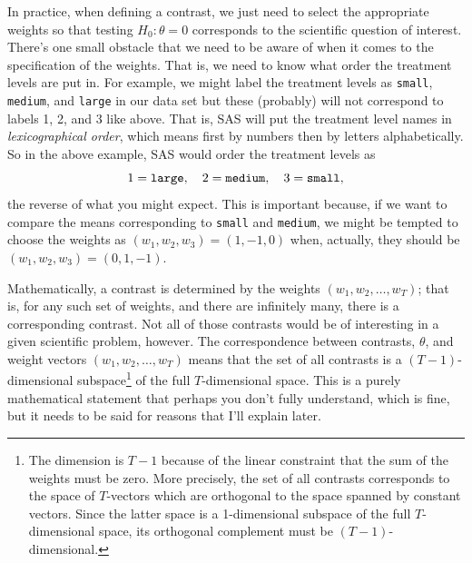 \documentclass[a4paper, 12pt]{article}
\theoremstyle{plain}
\theoremstyle{definition}
\theoremstyle{remark}
\begin{document}
In practice, when defining a contrast, we just need to select the appropriate weights so that testing $H_0: \theta=0$ corresponds to the scientific question of interest.  There's one small obstacle that we need to be aware of when it comes to the specification of the weights.  That is, we need to know what order the treatment levels are put in.  For example, we might label the treatment levels as {\tt small}, {\tt medium}, and {\tt large} in our data set but these (probably) will not correspond to labels 1, 2, and 3 like above.  That is, SAS will put the treatment level names in {\em lexicographical order}, which means first by numbers then by letters alphabetically.  So in the above example, SAS would order the treatment levels as 
\[ 1 = \text{\tt large}, \quad 2 = \text{\tt medium}, \quad 3 = \text{\tt small}, \]
the reverse of what you might expect.  This is important because, if we want to compare the means corresponding to {\tt small} and {\tt medium}, we might be tempted to choose the weights as $(w_1,w_2,w_3) = (1,-1,0)$ when, actually, they should be $(w_1,w_2,w_3) = (0, 1, -1)$.  

Mathematically, a contrast is determined by the weights $(w_1,w_2,\ldots,w_T)$; that is, for any such set of weights, and there are infinitely many, there is a corresponding contrast.  Not all of those contrasts would be of interesting in a given scientific problem, however.  The correspondence between contrasts, $\theta$, and weight vectors $(w_1,w_2,\ldots,w_T)$ means that the set of all contrasts is a $(T-1)$-dimensional subspace\footnote{The dimension is $T-1$ because of the linear constraint that the sum of the weights must be zero.  More precisely, the set of all contrasts corresponds to the space of $T$-vectors which are orthogonal to the space spanned by constant vectors.  Since the latter space is a 1-dimensional subspace of the full $T$-dimensional space, its orthogonal complement must be $(T-1)$-dimensional.} of the full $T$-dimensional space.  This is a purely mathematical statement that perhaps you don't fully understand, which is fine, but it needs to be said for reasons that I'll explain later.  
\end{document}
